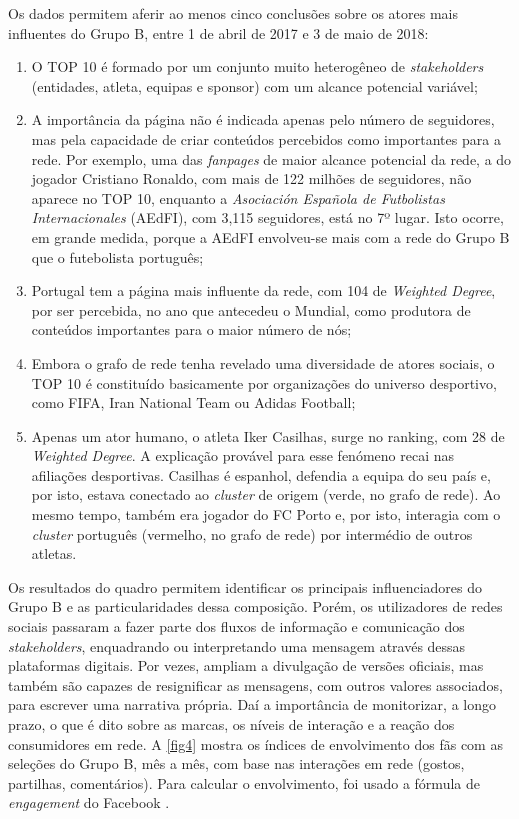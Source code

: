 \documentclass{textolivre}
\begin{document}
Os dados permitem aferir ao menos cinco conclusões sobre os atores mais influentes do Grupo B, entre 1 de abril de 2017 e 3 de maio de 2018:

\begin{enumerate}[label=\roman*.]
\item O TOP 10 é formado por um conjunto muito heterogêneo de \emph{stakeholders} (entidades, atleta, equipas e sponsor) com um alcance potencial variável;
\item A importância da página não é indicada apenas pelo número de seguidores, mas pela capacidade de criar conteúdos percebidos como importantes para a rede. Por exemplo, uma das \emph{fanpages} de maior alcance potencial da rede, a do jogador Cristiano Ronaldo, com mais de 122 milhões de seguidores, não aparece no TOP 10, enquanto a \emph{Asociación Española de Futbolistas Internacionales} (AEdFI), com 3,115 seguidores, está no 7º lugar. Isto ocorre, em grande medida, porque a AEdFI envolveu-se mais com a rede do Grupo B que o futebolista português;
\item Portugal tem a página mais influente da rede, com 104 de \emph{Weighted Degree}, por ser percebida, no ano que antecedeu o Mundial, como produtora de conteúdos importantes para o maior número de nós;
\item Embora o grafo de rede tenha revelado uma diversidade de atores sociais, o TOP 10 é constituído basicamente por organizações do universo desportivo, como FIFA, Iran National Team ou Adidas Football;
\item Apenas um ator humano, o atleta Iker Casilhas, surge no ranking, com 28 de \emph{Weighted Degree}. A explicação provável para esse fenómeno recai nas afiliações desportivas. Casilhas é espanhol, defendia a equipa do seu país e, por isto, estava conectado ao \emph{cluster} de origem (verde, no grafo de rede). Ao mesmo tempo, também era jogador do FC Porto e, por isto, interagia com o \emph{cluster} português (vermelho, no grafo de rede) por intermédio de outros atletas.
\end{enumerate}

Os resultados do quadro permitem identificar os principais influenciadores do Grupo B e as particularidades dessa composição. Porém, os utilizadores de redes sociais passaram a fazer parte dos fluxos de informação e comunicação dos \emph{stakeholders}, enquadrando ou interpretando uma mensagem através dessas plataformas digitais. Por vezes, ampliam a divulgação de versões oficiais, mas também são capazes de resignificar as mensagens, com outros valores associados, para escrever uma narrativa própria. Daí a importância de monitorizar, a longo prazo, o que é dito sobre as marcas, os níveis de interação e a reação dos consumidores em rede. A \cref{fig4} mostra os índices de envolvimento dos fãs com as seleções do Grupo B, mês a mês, com base nas interações em rede (gostos, partilhas, comentários). Para calcular o envolvimento, foi usado a fórmula de \emph{engagement} do Facebook \cite{vadivu2015}.
\end{document}
